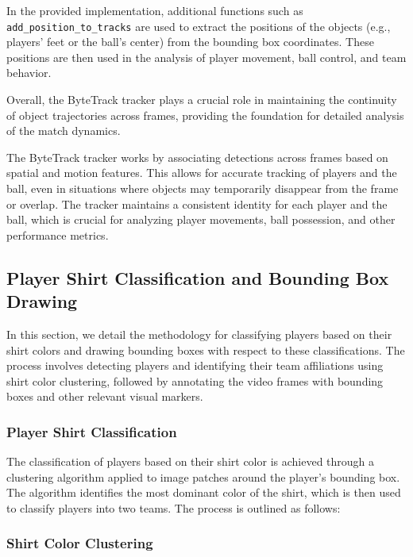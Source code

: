 In the provided implementation, additional functions such as \texttt{add\_position\_to\_tracks} are used to extract the positions of the objects (e.g., players' feet or the ball's center) from the bounding box coordinates. These positions are then used in the analysis of player movement, ball control, and team behavior.

Overall, the ByteTrack tracker plays a crucial role in maintaining the continuity of object trajectories across frames, providing the foundation for detailed analysis of the match dynamics.


The ByteTrack tracker works by associating detections across frames based on spatial and motion features. This allows for accurate tracking of players and the ball, even in situations where objects may temporarily disappear from the frame or overlap. The tracker maintains a consistent identity for each player and the ball, which is crucial for analyzing player movements, ball possession, and other performance metrics.




\subsection{Player Shirt Classification and Bounding Box Drawing}

In this section, we detail the methodology for classifying players based on their shirt colors and drawing bounding boxes with respect to these classifications. The process involves detecting players and identifying their team affiliations using shirt color clustering, followed by annotating the video frames with bounding boxes and other relevant visual markers.

\subsubsection{Player Shirt Classification}

The classification of players based on their shirt color is achieved through a clustering algorithm applied to image patches around the player's bounding box. The algorithm identifies the most dominant color of the shirt, which is then used to classify players into two teams. The process is outlined as follows:

\subsubsection{Shirt Color Clustering}


